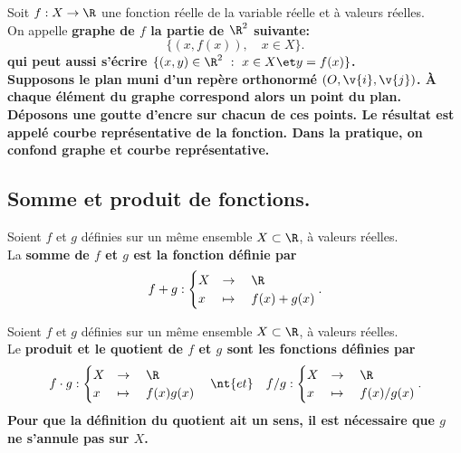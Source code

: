 \documentclass[11pt]{article}
\begin{document}
\begin{defi}{}{}
    Soit $f:X\to\R$ une fonction réelle de la variable réelle et à valeurs réelles.\\
    On appelle \bf{graphe} de $f$ la partie de $\R^2$ suivante:
    \begin{equation*}
        \{(x,f(x)),\quad x\in X\}.
    \end{equation*}
    qui peut aussi s'écrire $\{(x,y)\in\R^2~:~x\in X\et y=f(x)\}$.\\
    Supposons le plan muni d'un repère orthonormé $(O,\v{i}, \v{j})$. À chaque élément du graphe correspond alors un point du plan. Déposons une goutte d'encre sur chacun de ces points. Le résultat est appelé \bf{courbe représentative} de la fonction. Dans la pratique, on confond graphe et courbe représentative.
\end{defi}

\subsection{Somme et produit de fonctions.}

\begin{defi}{}{}
    Soient $f$ et $g$ définies sur un même ensemble $X\subset\R$, à valeurs réelles.\\
    La \bf{somme} de $f$ et $g$ est la fonction définie par
    \begin{equation*}
        f+g:\begin{cases}
            X&\to\quad\R\\
            x&\mapsto\quad f(x)+g(x)
        \end{cases}.
    \end{equation*}
\end{defi}

\begin{defi}{}{}
    Soient $f$ et $g$ définies sur un même ensemble $X\subset\R$, à valeurs réelles.\\
    Le \bf{produit} et le \bf{quotient} de $f$ et $g$ sont les fonctions définies par
    \begin{equation*}
        f\cdot g:\begin{cases}
            X&\to\quad\R\\
            x&\mapsto\quad f(x)g(x)
        \end{cases} \quad \nt{et} \quad f/g : \begin{cases}
            X&\to\quad\R\\
            x&\mapsto\quad f(x)/g(x)
        \end{cases}.
    \end{equation*}
    Pour que la définition du quotient ait un sens, il est nécessaire que $g$ ne s'annule pas sur $X$.
\end{defi}
\end{document}
